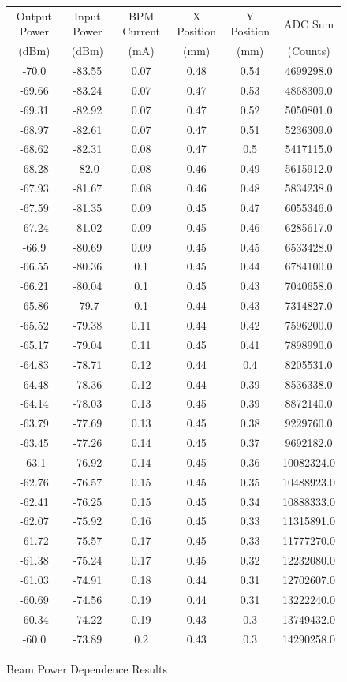 \documentclass[a4paper, 11pt]{article}%
\begin{document}
%
\begin{figure}[htbp]%
\centering%
\caption{Beam Power Dependence Results}%
\begin{tabular}{|c|c|c|c|c|c|}%
\hline%
Output Power&Input Power&BPM Current&X Position&Y Position&ADC Sum\\%
(dBm)&(dBm)&(mA)&(mm)&(mm)&(Counts)\\%
\hline%
{-}70.0&{-}83.55&0.07&0.48&0.54&4699298.0\\%
{-}69.66&{-}83.24&0.07&0.47&0.53&4868309.0\\%
{-}69.31&{-}82.92&0.07&0.47&0.52&5050801.0\\%
{-}68.97&{-}82.61&0.07&0.47&0.51&5236309.0\\%
{-}68.62&{-}82.31&0.08&0.47&0.5&5417115.0\\%
{-}68.28&{-}82.0&0.08&0.46&0.49&5615912.0\\%
{-}67.93&{-}81.67&0.08&0.46&0.48&5834238.0\\%
{-}67.59&{-}81.35&0.09&0.45&0.47&6055346.0\\%
{-}67.24&{-}81.02&0.09&0.45&0.46&6285617.0\\%
{-}66.9&{-}80.69&0.09&0.45&0.45&6533428.0\\%
{-}66.55&{-}80.36&0.1&0.45&0.44&6784100.0\\%
{-}66.21&{-}80.04&0.1&0.45&0.43&7040658.0\\%
{-}65.86&{-}79.7&0.1&0.44&0.43&7314827.0\\%
{-}65.52&{-}79.38&0.11&0.44&0.42&7596200.0\\%
{-}65.17&{-}79.04&0.11&0.45&0.41&7898990.0\\%
{-}64.83&{-}78.71&0.12&0.44&0.4&8205531.0\\%
{-}64.48&{-}78.36&0.12&0.44&0.39&8536338.0\\%
{-}64.14&{-}78.03&0.13&0.45&0.39&8872140.0\\%
{-}63.79&{-}77.69&0.13&0.45&0.38&9229760.0\\%
{-}63.45&{-}77.26&0.14&0.45&0.37&9692182.0\\%
{-}63.1&{-}76.92&0.14&0.45&0.36&10082324.0\\%
{-}62.76&{-}76.57&0.15&0.45&0.35&10488923.0\\%
{-}62.41&{-}76.25&0.15&0.45&0.34&10888333.0\\%
{-}62.07&{-}75.92&0.16&0.45&0.33&11315891.0\\%
{-}61.72&{-}75.57&0.17&0.45&0.33&11777270.0\\%
{-}61.38&{-}75.24&0.17&0.45&0.32&12232080.0\\%
{-}61.03&{-}74.91&0.18&0.44&0.31&12702607.0\\%
{-}60.69&{-}74.56&0.19&0.44&0.31&13222240.0\\%
{-}60.34&{-}74.22&0.19&0.43&0.3&13749432.0\\%
{-}60.0&{-}73.89&0.2&0.43&0.3&14290258.0\\%
\hline%
\end{tabular}%
\end{figure}%
\end{document}
